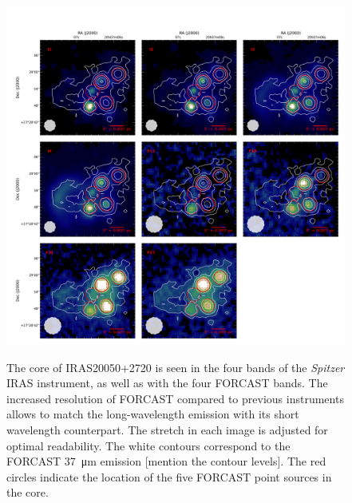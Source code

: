 \begin{figure}
\begin{center}
\includegraphics[width=1\textwidth]{Figures/IRAS20050_SOFIA.png}
\label{fig:IRAS20050_mosaic}
\caption{The core of IRAS20050+2720 is seen in the four bands of the \textit{Spitzer} IRAS instrument, as well as with the four FORCAST bands. The increased resolution of FORCAST compared to previous instruments allows to match the long-wavelength emission with its short wavelength counterpart. The stretch in each image is adjusted for optimal readability. The white contours correspond to the FORCAST \SI{37}{\micro\meter} emission [mention the contour levels]. The red circles indicate the location of the five FORCAST point sources in the core.}
\end{center}
\end{figure}

